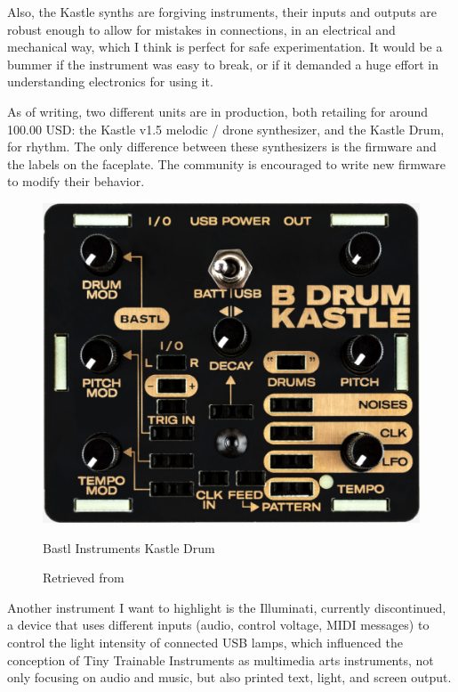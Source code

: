 Also, the Kastle synths are forgiving instruments, their inputs and outputs are robust enough to allow for mistakes in connections, in an electrical and mechanical way, which I think is perfect for safe experimentation. It would be a bummer if the instrument was easy to break, or if it demanded a huge effort in understanding electronics for using it. 

As of writing, two different units are in production, both retailing for around 100.00 USD: the Kastle v1.5 melodic / drone synthesizer, and the Kastle Drum, for rhythm. The only difference between these synthesizers is the firmware and the labels on the faceplate. The community is encouraged to write new firmware to modify their behavior. 

\begin{figure}[ht]
  \centering
  \includegraphics[width=0.75\linewidth,height=0.25\textheight,keepaspectratio]{images/bastl-kastle-drum.jpg}
  \caption{Bastl Instruments Kastle Drum}
  \caption*{Retrieved from \cite{website-bastl-instruments-current}}
  \label{fig:bastl-kastle-drum}
\end{figure}

Another instrument I want to highlight is the Illuminati, currently discontinued, a device that uses different inputs (audio, control voltage, \acrshort{MIDI} messages) to control the light intensity of connected USB lamps, which influenced the conception of Tiny Trainable Instruments as multimedia arts instruments, not only focusing on audio and music, but also printed text, light, and screen output.

